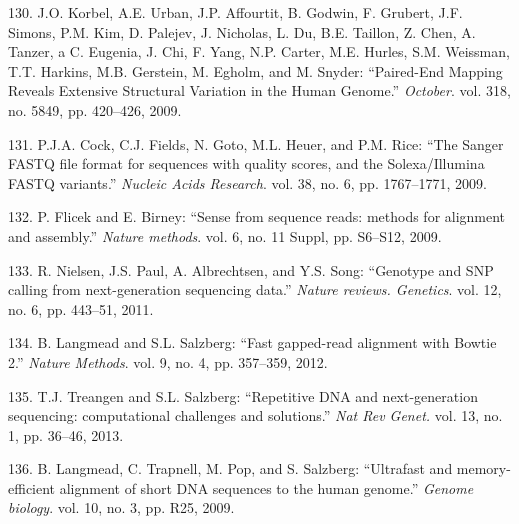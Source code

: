 \documentclass[12pt,a4paper,twoside]{ugathesis}
\theoremstyle{definition}
\theoremstyle{definition}
\theoremstyle{definition}
\theoremstyle{remark}
\begin{document}
\hypertarget{ref-Korbel2009}{}
130. J.O. Korbel, A.E. Urban, J.P. Affourtit, B. Godwin, F. Grubert,
J.F. Simons, P.M. Kim, D. Palejev, J. Nicholas, L. Du, B.E. Taillon, Z.
Chen, A. Tanzer, a C. Eugenia, J. Chi, F. Yang, N.P. Carter, M.E.
Hurles, S.M. Weissman, T.T. Harkins, M.B. Gerstein, M. Egholm, and M.
Snyder: ``Paired-End Mapping Reveals Extensive Structural Variation in
the Human Genome.'' \emph{October}. vol. 318, no. 5849, pp. 420--426,
2009.

\hypertarget{ref-Cock2009}{}
131. P.J.A. Cock, C.J. Fields, N. Goto, M.L. Heuer, and P.M. Rice: ``The
Sanger FASTQ file format for sequences with quality scores, and the
Solexa/Illumina FASTQ variants.'' \emph{Nucleic Acids Research}. vol.
38, no. 6, pp. 1767--1771, 2009.

\hypertarget{ref-Flicek2009}{}
132. P. Flicek and E. Birney: ``Sense from sequence reads: methods for
alignment and assembly.'' \emph{Nature methods}. vol. 6, no. 11 Suppl,
pp. S6--S12, 2009.

\hypertarget{ref-Nielsen2011}{}
133. R. Nielsen, J.S. Paul, A. Albrechtsen, and Y.S. Song: ``Genotype
and SNP calling from next-generation sequencing data.'' \emph{Nature
reviews. Genetics}. vol. 12, no. 6, pp. 443--51, 2011.

\hypertarget{ref-Langmead2012}{}
134. B. Langmead and S.L. Salzberg: ``Fast gapped-read alignment with
Bowtie 2.'' \emph{Nature Methods}. vol. 9, no. 4, pp. 357--359, 2012.

\hypertarget{ref-Treangen2013}{}
135. T.J. Treangen and S.L. Salzberg: ``Repetitive DNA and
next-generation sequencing: computational challenges and solutions.''
\emph{Nat Rev Genet.} vol. 13, no. 1, pp. 36--46, 2013.

\hypertarget{ref-Langmead2009}{}
136. B. Langmead, C. Trapnell, M. Pop, and S. Salzberg: ``Ultrafast and
memory-efficient alignment of short DNA sequences to the human genome.''
\emph{Genome biology}. vol. 10, no. 3, pp. R25, 2009.
\end{document}
